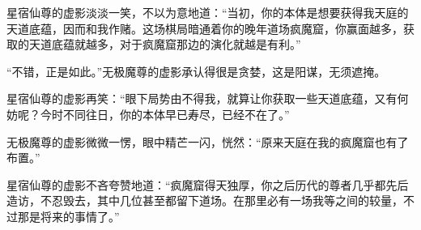 \begin{this_body}
星宿仙尊的虚影淡淡一笑，不以为意地道：“当初，你的本体是想要获得我天庭的天道底蕴，因而和我作赌。这场棋局暗通着你的晚年道场疯魔窟，你赢面越多，获取的天道底蕴就越多，对于疯魔窟那边的演化就越是有利。”

“不错，正是如此。”无极魔尊的虚影承认得很是贪婪，这是阳谋，无须遮掩。

星宿仙尊的虚影再笑：“眼下局势由不得我，就算让你获取一些天道底蕴，又有何妨呢？今时不同往日，你的本体早已寿尽，已经不在了。”

无极魔尊的虚影微微一愣，眼中精芒一闪，恍然：“原来天庭在我的疯魔窟也有了布置。”

星宿仙尊的虚影不吝夸赞地道：“疯魔窟得天独厚，你之后历代的尊者几乎都先后造访，不忍毁去，其中几位甚至都留下道场。在那里必有一场我等之间的较量，不过那是将来的事情了。”

\end{this_body}

